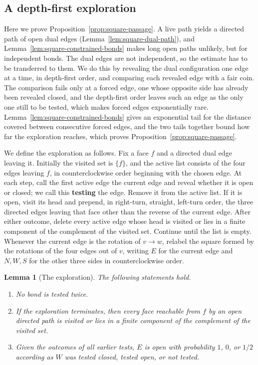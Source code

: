 \documentclass[11pt]{amsart}
\theoremstyle{plain}
\newtheorem{lemma}[theorem]{Lemma}
\theoremstyle{definition}
\newcommand{\defn}[1]{\textbf{#1}}
\begin{document}
	\subsection{A depth-first exploration}\label{ssec:square-exploration}
	
	Here we prove Proposition~\ref{prop:square-passage}.  A live path yields a
	directed path of open dual edges (Lemma~\ref{lem:square-dual-path}), and
	Lemma~\ref{lem:square-constrained-bonds} makes long open paths unlikely, but
	for independent bonds.  The dual edges are not independent, so
	the estimate has to be transferred to them.  We do this by revealing the dual
	configuration one edge at a time, in depth-first order, and comparing each
	revealed edge with a fair coin.  The comparison fails only at a forced edge,
	one whose opposite side has already been revealed closed, and the depth-first
	order leaves such an edge as the only one still to be tested, which makes
	forced edges exponentially rare.
	Lemma~\ref{lem:square-constrained-bonds} gives an exponential tail for the
	distance covered between consecutive forced edges, and the two tails together
	bound how far the exploration reaches, which proves
	Proposition~\ref{prop:square-passage}.

	We define the exploration as follows.  Fix a face $f$ and a directed dual edge
	leaving it.  Initially the visited set
	is $\{f\}$, and the active list consists of the four edges leaving $f$, in
	counterclockwise order beginning with the chosen edge.  At each step, call the
	first active edge the current edge and reveal whether it is open or closed; we
	call this \defn{testing} the edge.  Remove it from the active list.  If it is open,
	visit its head and prepend, in right-turn, straight, left-turn order, the three
	directed edges leaving that face other than the reverse of the current edge.
	After either outcome, delete every active edge whose head is visited or lies in
	a finite component of the complement of the visited set.  Continue until the
	list is empty.
	Whenever the current edge is the rotation of $v\to w$, relabel the square formed
	by the rotations of the four edges out of $v$, writing $E$ for the current edge
	and $N,W,S$ for the other three sides in counterclockwise order.  
	
	\begin{lemma}[The exploration]\label{lem:square-exploration}
		The following statements hold.
		\begin{enumerate}[label=\textup{(\roman*)}]
			\item No bond is tested twice.
			\item If the exploration terminates, then every face reachable from $f$ by
			an open directed path is visited or lies in a finite component of the
			complement of the visited set.
			\item Given the outcomes of all earlier tests, $E$ is open with probability $1$,
			$0$, or $1/2$ according as $W$ was tested closed, tested open, or not
			tested.
		\end{enumerate}
	\end{lemma}
	
\end{document}
